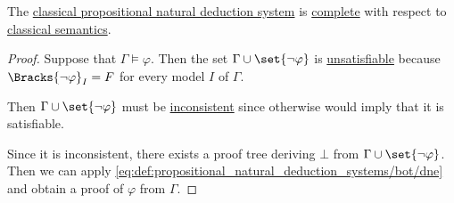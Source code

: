\begin{theorem}\label{thm:classical_propositional_completeness}
  The \hyperref[def:propositional_natural_deduction_systems]{classical propositional natural deduction system} is \hyperref[def:logical_framework/completeness]{complete} with respect to \hyperref[def:classical_semantics]{classical semantics}.
\end{theorem}
\begin{proof}
  Suppose that \( \Gamma \vDash \varphi \). Then the set \( \Gamma \cup \set{ \neg \varphi } \) is \hyperref[def:satisfiable_set_of_sentences]{unsatisfiable} because \( \Bracks{\neg \varphi}_I = F \) for every model \( I \) of \( \Gamma \).

  Then \( \Gamma \cup \set{ \neg \varphi } \) must be \hyperref[def:consistent_set_of_sentences]{inconsistent} since otherwise  would imply that it is satisfiable.

  Since it is inconsistent, there exists a proof tree deriving \( \bot \) from \( \Gamma \cup \set{ \neg \varphi } \). Then we can apply \ref{eq:def:propositional_natural_deduction_systems/bot/dne} and obtain a proof of \( \varphi \) from \( \Gamma \).
\end{proof}

